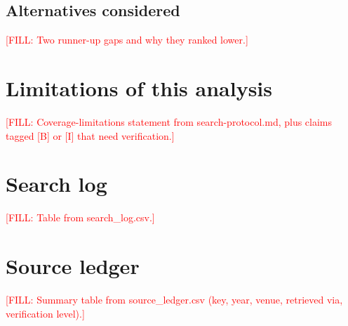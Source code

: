 \documentclass[11pt]{article}
\newcommand{\fillin}[1]{\textcolor{red}{[FILL: #1]}}
\begin{document}
\subsection{Alternatives considered}
\fillin{Two runner-up gaps and why they ranked lower.}

\section{Limitations of this analysis}
\fillin{Coverage-limitations statement from search-protocol.md, plus claims tagged [B] or [I] that need verification.}

\appendix
\section{Search log}\label{app:log}
\fillin{Table from search\_log.csv.}

\section{Source ledger}
\fillin{Summary table from source\_ledger.csv (key, year, venue, retrieved via, verification level).}

\end{document}
